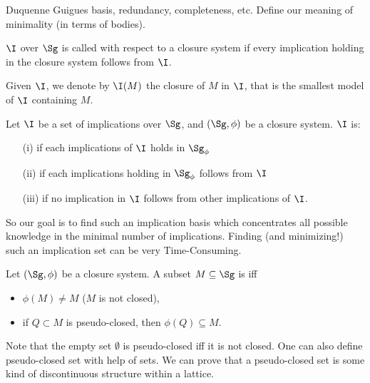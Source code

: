 

Duquenne Guigues basis, redundancy, completeness, etc. Define our meaning of
minimality (in terms of bodies). 

\begin{definition} $\I$ over $\Sg$ is called 
	 with respect to a closure system if every implication 
	holding
	in the closure system follows from $\I$.
	
\end{definition}

Given $\I$, we denote by $\I(M)$ the closure of $M$ in $\I$, that is the 
smallest model of $\I$ containing $M$.

\begin{definition} Let $\I$ be a set of 
	implications over $\Sg$, and $(\Sg, \phi)$ be a closure system. $\I$ is:
	\begin{itemize}
		\item[(i)]  if each implications of $\I$ holds in 
		$\Sg_\phi$
		\item[(ii)]  if each implications holding in 
		$\Sg_\phi$ 
		follows from $\I$
		\item[(iii)]  if no implication in $\I$ follows 
		from 
		other implications of $\I$.
	\end{itemize}
	
\end{definition}

So our goal is to find such an implication basis which concentrates all possible
knowledge in the minimal number of implications. Finding (and minimizing!) such
an implication set can be very Time-Consuming.

\begin{definition} Let $(\Sg, \phi)$ be a closure 
	system. A subset $M \subseteq \Sg$ is  iff 
	\begin{itemize}
		\item $\phi(M) \neq M$ ($M$ is not closed),
		\item if $Q \subset M$ is pseudo-closed, then $\phi(Q) \subseteq M$.
	\end{itemize}
	
\end{definition}

Note that the empty set $\emptyset$ is pseudo-closed iff it is not closed. One 
can also define pseudo-closed set with help of  sets. We
can prove that a pseudo-closed set is some kind of discontinuous structure 
within a lattice.

